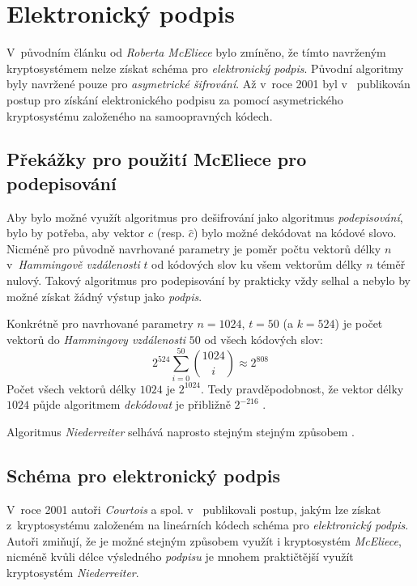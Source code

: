 \documentclass[thesis=M,czech,hidelinks]{FITthesis}[2012/06/26]
\newcommand{\0}{{\textcolor[gray]{0.80}{0}}}
\begin{document}
\section{Elektronický podpis}
V~původním článku od \emph{Roberta McEliece} \cite{McEliece} bylo zmíněno, že tímto
navrženým kryptosystémem nelze získat schéma pro \emph{elektronický podpis}.
Původní algoritmy byly navržené pouze pro \emph{asymetrické šifrování}. Až
v~roce 2001 byl v~\cite{Courtois} publikován postup pro získání elektronického
podpisu za pomocí asymetrického kryptosystému založeného na samoopravných
kódech.

\subsection{Překážky pro použití McEliece pro podepisování}
Aby bylo možné využít algoritmus pro dešifrování jako algoritmus
\emph{podepisování}, bylo by potřeba, aby vektor $c$ (resp. $\hat{c}$) bylo
možné dekódovat na kódové slovo. Nicméně pro původně navrhované parametry je
poměr počtu vektorů délky $n$ v~\emph{Hammingově vzdálenosti} $t$
od kódových slov ku všem vektorům délky $n$ téměř nulový. Takový algoritmus pro
podepisování by prakticky vždy selhal a nebylo by možné získat žádný výstup jako
\emph{podpis}.

Konkrétně pro navrhované parametry $n=1024$, $t=50$ (a $k=524$) je počet
vektorů do \emph{Hammingovy vzdálenosti} $50$ od všech kódových slov:
$$ 2^{524}\sum_{i = 0}^{50}\binom{1024}{i} \approx 2^{808}$$
Počet všech vektorů délky $1024$ je $2^{1024}$. Tedy pravděpodobnost, že vektor
délky $1024$ půjde algoritmem \emph{dekódovat} je přibližně $2^{-216}$
\cite{McEliece}.

Algoritmus \emph{Niederreiter} selhává naprosto stejným stejným způsobem
\cite{Courtois}.

\subsection{Schéma pro elektronický podpis}\label{kap_schema_pro_podpis}
V~roce 2001 autoři \emph{Courtois} a spol. v~\cite{Courtois} publikovali postup,
jakým lze získat z~kryptosystému založeném na lineárních kódech schéma pro
\emph{elektronický podpis}. Autoři zmiňují, že je možné stejným způsobem využít
i kryptosystém \emph{McEliece}, nicméně kvůli délce výsledného \emph{podpisu} je
mnohem praktičtější využít kryptosystém \emph{Niederreiter}.
\end{document}
